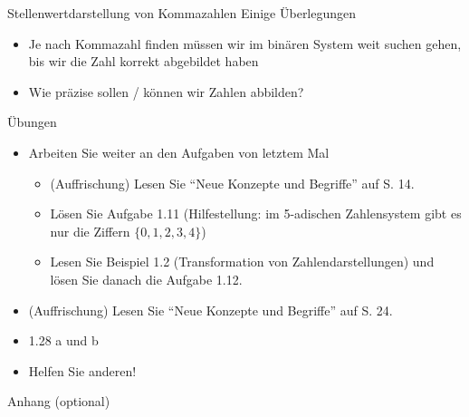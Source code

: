 \begin{frame}{Stellenwertdarstellung von Kommazahlen}
Einige Überlegungen
\begin{itemize}
    \item Je nach Kommazahl finden müssen wir im binären System weit suchen gehen, bis wir die Zahl korrekt abgebildet haben
    \item Wie präzise sollen / können wir Zahlen abbilden?
\end{itemize}
\end{frame}

\begin{frame}{Übungen}
\begin{itemize}
    \item Arbeiten Sie weiter an den Aufgaben von letztem Mal
    \begin{itemize}
        \item (Auffrischung) Lesen Sie ``Neue Konzepte und Begriffe'' auf S. 14.
        \item Lösen Sie Aufgabe 1.11 (Hilfestellung: im 5-adischen Zahlensystem gibt es nur die Ziffern $\{0,1,2,3,4\}$)
        \item Lesen Sie Beispiel 1.2 (Transformation von Zahlendarstellungen) und lösen Sie danach die Aufgabe 1.12.
    \end{itemize}
    \item (Auffrischung) Lesen Sie ``Neue Konzepte und Begriffe'' auf S. 24.
    \item 1.28 a und b
    \item Helfen Sie anderen!
\end{itemize}
\end{frame}

\begin{frame}{Anhang (optional)}
\end{frame}

